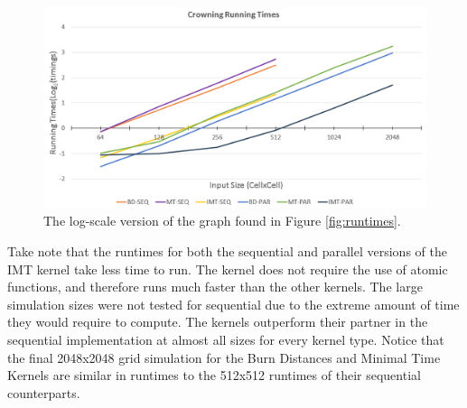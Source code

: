 \begin{figure}%
\centering
  \includegraphics[width=\textwidth]{figures/results/crowning_log.png}
  \caption{The log-scale version of the graph found in Figure \ref{fig:runtimes}.}
  \label{fig:runtimes_log}
\end{figure} 

Take note that the runtimes for both the sequential and parallel versions of the IMT kernel take less time to run. The kernel does not require the use of atomic functions, and therefore runs much faster than the other kernels. The large simulation sizes were not tested for sequential due to the extreme amount of time they would require to compute. The kernels outperform their partner in the sequential implementation at almost all sizes for every kernel type. Notice that the final 2048x2048 grid simulation for the Burn Distances and Minimal Time Kernels are similar in runtimes to the 512x512 runtimes of their sequential counterparts. 

